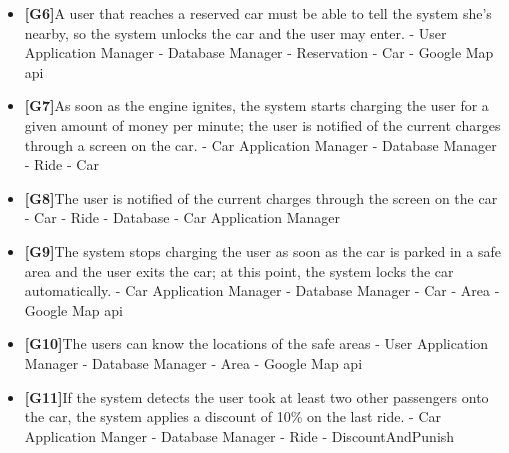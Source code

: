 \documentclass{article}
\begin{document}
\begin{itemize}
		\item\textbf{[G6]}A user that reaches a reserved car must be able to tell the system she’s nearby, so the system unlocks the car and the user may enter.
		\newline - User Application Manager
		\newline - Database Manager
		\newline - Reservation
		\newline - Car
		\newline - Google Map api
		
		\item\textbf{[G7]}As soon as the engine ignites, the system starts charging the user for a given amount of money per minute; the user is notified of the current charges through a screen on the car.
		\newline - Car Application Manager
		\newline - Database Manager
		\newline - Ride
		\newline - Car
		
		\item\textbf{[G8]}The user is notified of the current charges through the screen on the car
		\newline - Car
		\newline - Ride
		\newline - Database
		\newline - Car Application Manager
		
		\item\textbf{[G9]}The system stops charging the user as soon as the car is parked in a safe area and the user exits the car; at this point, the system locks the car automatically.
		\newline - Car Application Manager 
		\newline - Database Manager
		\newline - Car
		\newline - Area
		\newline - Google Map api
		
		\item\textbf{[G10]}The users can know the locations of the safe areas
		\newline - User Application Manager
		\newline - Database Manager
		\newline - Area
		\newline - Google Map api
		
		\item\textbf{[G11]}If the system detects the user took at least two other passengers onto the car, the system applies a discount of 10\% on the last ride.
		\newline - Car Application Manger 
		\newline - Database Manager 
		\newline - Ride
		\newline - DiscountAndPunish
		

\end{itemize}
\end{document}
